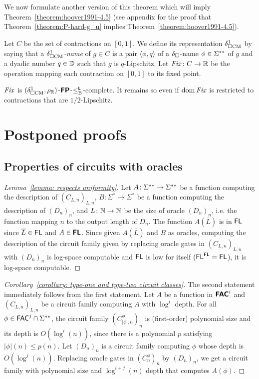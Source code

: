 \documentclass[envcountsame,orivec,oribibl]{llncs}
\begin{document}
We now formulate another version of this theorem which 
will imply Theorem~\ref{theorem:hoover1991-4.5}
(see appendix for the proof that Theorem~\ref{theorem:P-hard-g_u} 
implies Theorem~\ref{theorem:hoover1991-4.5}). 

Let $C$ be the set of contractions on $[0, 1]$. 
We define its representation $\delta _{\square \mathrm{CM}}^1$ by saying that 
a \emph{$\delta _{\square \mathrm{CM}}^1$-name} of $g \in C$
is a pair $\langle \phi, q \rangle$ of 
a $\delta _\square$-name $\phi \in \Sigma ^{**}$ of $g$ 
and a dyadic number $q \in \mathbb D$ such that $g$ is $q$-Lipschitz. 
Let $\mathit{Fix} \colon C \to \mathbb R$ be the operation 
mapping each contraction on $[0, 1]$ to its fixed point.

\begin{theorem}
\label{theorem:P-hard-g_u}
$\mathit{Fix}$ is $(\delta _{\square \mathrm{CM}}^1, \rho _\mathbb R)$-$\text{\bfseries \sffamily \upshape FP}$-$\leq _{\mathrm B} ^{\text{\bfseries \sffamily \upshape L}}$-complete. 
It remains so even if $\mathop{\rm dom} \mathit{Fix}$ is restricted to contractions 
that are $1/2$-Lipschitz.
\end{theorem}




\clearpage
\appendix
\section{Postponed proofs}

\subsection{Properties of circuits with oracles}

\begin{proof}[Lemma~\ref{lemma: respects uniformity}]
 Let $A \colon \Sigma ^{**} \to \Sigma ^{**}$ be a function computing the description of $(C_{L,n})_{L,n}$,
 $B \colon \Sigma^* \to \Sigma^*$ be a function computing the description of $(D_n)_n$, and
 $L \colon \mathbb N \to \mathbb N$ be the size of oracle $(D_n)_n$, i.e.
 the function mapping $n$ to the output length of $D_n$.
 The function $A(\overline{L})$ is in $\mathsf{FL}$ since $\overline{L} \in \mathsf{FL}$ and $A \in \text{\bfseries \sffamily \upshape FL}$.
 Since given $A(\overline{L})$ and $B$ as oracles,
 computing the description of the circuit family given by replacing oracle
 gates in $(C_{L,n})_{L,n}$ with $(D_n)_n$ is log-space computable
 and $\mathsf{FL}$ is low for itself ($\mathsf{FL}^{\mathsf{FL}} = \mathsf{FL}$),
 it is log-space computable.
\end{proof}

\begin{proof}[Corollary~\ref{corollary: type-one and type-two circuit classes}]
The second statement immediately follows from the first statement.
Let $A$ be a function in $\text{\bfseries \sffamily \upshape FAC}^i$ and $(C_{L,n})_{L,n}$ be a circuit
family computing $A$ with $\log^i$ depth.
For all $\phi \in \mathsf{FAC}^j \cap \Sigma ^{**}$, 
the circuit family $(C^\phi_{|\phi|,n})_n$ is (first-order) polynomial size and its depth is $O(\log^i(n))$,
since there is a polynomial $p$ satisfying $|\phi|(n) \le p(n)$.
Let $(D_n)_n$ is a circuit family computing $\phi$ whose depth is $O(\log^j(n))$.
Replacing oracle gates in $(C^\phi_n)_n$ by $(D_n)_n$, 
we get a circuit family with polynomial size and $\log^{i+j}(n)$ depth
that computes $A(\phi)$.
\end{proof}
\end{document}
